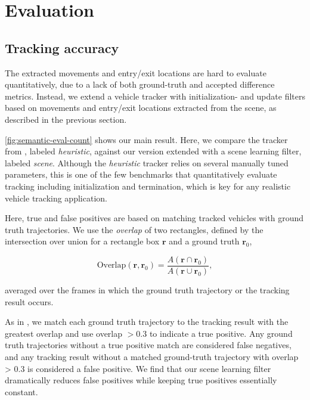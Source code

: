 \section{Evaluation}
\label{sec:semantic-eval}


\subsection{Tracking accuracy}

The extracted movements and entry/exit locations are hard to evaluate quantitatively, due to a lack of both ground-truth and accepted difference metrics.
Instead, we extend a vehicle tracker with initialization- and update filters based on movements and entry/exit locations extracted from the scene, as described in the previous section.



\ref{fig:semantic-eval-count} shows our main result. Here, we compare the tracker from \cite{yanziVehicleTracker}, labeled {\it heuristic}, against our version extended with a scene learning filter, labeled {\it scene}. 
Although the {\it heuristic} tracker relies on several manually tuned parameters, this is one of the few benchmarks that quantitatively evaluate tracking including initialization and termination, which is key for any realistic vehicle tracking application.

Here, true and false positives are based on matching tracked vehicles with ground truth trajectories.
We use the {\it overlap} of two rectangles, defined by the intersection over union for a rectangle box $\bm{r}$ and a ground truth $\bm{r}_0$,

$$\text{Overlap}(\bm{r}, \bm{r}_0) = \frac{A(\bm{r} \cap \bm{r}_0)}{A(\bm{r} \cup \bm{r}_0)},$$

averaged over the frames in which the ground truth trajectory or the tracking result occurs. 

As in \cite{yanziVehicleTracker}, we match each ground truth trajectory to the tracking result with the greatest overlap and use overlap $> 0.3$ to indicate a true positive. Any ground truth trajectories without a true positive match are considered false negatives, and any tracking result without a matched ground-truth trajectory with overlap > 0.3 is considered a false positive.
We find that our scene learning filter dramatically reduces false positives while keeping true positives essentially constant. 

